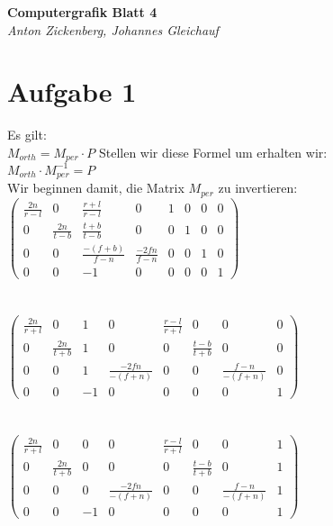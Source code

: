\documentclass[12pt]{article}
\begin{document}
\begin{center}
 \textbf{\Large Computergrafik Blatt 4}\\
 \emph{Anton Zickenberg, Johannes Gleichauf}
\end{center}

\section*{Aufgabe 1}
Es gilt:\\
$M_{orth} = M_{per} \cdot P$
Stellen wir diese Formel um erhalten wir:\\
$M_{orth} \cdot  M_{per}^{-1} =  P$\\
Wir beginnen damit, die Matrix $M_{per}$ zu invertieren:\\
$\left(
\begin{array}{cccc|cccc}
  \frac{2n}{r-l} &  0 &  \frac{r+l}{r-l} & 0 & 1 & 0 & 0 & 0 \\
  0 &  \frac{2n}{t-b} &  \frac{t+b}{t-b} & 0 & 0 & 1 & 0 & 0 \\
  0 & 0 & \frac{-(f+b)}{f-n} & \frac{-2fn}{f-n} & 0 & 0 & 1 & 0\\
  0 & 0 & -1 & 0 & 0 & 0 & 0 & 1
\end{array}
\right)$
\\
\\
\\
$\left(
\begin{array}{cccc|cccc}
  \frac{2n}{r+l} &  0 &  1 & 0 & \frac{r-l}{r+l} & 0 & 0 & 0 \\
  0 &  \frac{2n}{t+b} &  1 & 0 & 0 & \frac{t-b}{t+b} & 0 & 0 \\
  0 & 0 & 1 & \frac{-2fn}{-(f+n)} & 0 & 0 & \frac{f-n}{-(f+n)} & 0\\
  0 & 0 & -1 & 0 & 0 & 0 & 0 & 1
\end{array}
\right)$
\\
\\
\\
$\left(
\begin{array}{cccc|cccc}
  \frac{2n}{r+l} &  0 &  0 & 0 & \frac{r-l}{r+l} & 0 & 0 & 1 \\
  0 &  \frac{2n}{t+b} &  0 & 0 & 0 & \frac{t-b}{t+b} & 0 & 1 \\
  0 & 0 & 0 & \frac{-2fn}{-(f+n)} & 0 & 0 & \frac{f-n}{-(f+n)} & 1\\
  0 & 0 & -1 & 0 & 0 & 0 & 0 & 1
\end{array}
\right)$
\\
\\
\\
\end{document}
